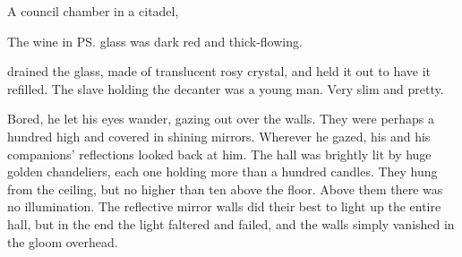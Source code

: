\begin{garbage}
\begin{comment}
  \section{In the Deep Halls of Darkness}
\end{comment}


\begin{comment}
  \subsection{Ganethed's citadel}
\end{comment}

\stamp
  {\dateIshnaruchaefirIntroduced}
  {A council chamber in a  citadel, }
\index{\CiriathSepher}
\index{\Nyx}

\index{\Teshrial}%
The wine in \ps{\Teshrial} glass was dark red and thick-flowing. 

\Teshrial{} drained the glass, made of translucent rosy crystal, and held it out to have it refilled. 
The slave holding the decanter was a young man. 
Very slim and pretty. 

Bored, he let his eyes wander, gazing out over the walls. 
They were perhaps a hundred \metres high and covered in shining mirrors. 
Wherever he gazed, his and his companions' reflections looked back at him. 
The hall was brightly lit by huge golden chandeliers, each one holding more than a hundred candles. 
They hung from the ceiling, but no higher than ten \metres above the floor. 
Above them there was no illumination. 
The reflective mirror walls did their best to light up the entire hall, but in the end the light faltered and failed, and the walls simply vanished in the gloom overhead. 

\end{garbage}
